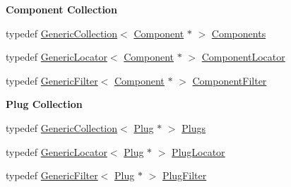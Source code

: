 \begin{Indent}\textbf{ Component Collection}\par
\begin{DoxyCompactItemize}
\item 
typedef \mbox{\hyperlink{classHurricane_1_1GenericCollection}{Generic\+Collection}}$<$ \mbox{\hyperlink{classHurricane_1_1Component}{Component}} $\ast$ $>$ \mbox{\hyperlink{namespaceHurricane_a7d26d99aeb5dd6d70d51bd35d2473e72}{Components}}
\item 
typedef \mbox{\hyperlink{classHurricane_1_1GenericLocator}{Generic\+Locator}}$<$ \mbox{\hyperlink{classHurricane_1_1Component}{Component}} $\ast$ $>$ \mbox{\hyperlink{namespaceHurricane_ad72b1998a4ff6e68326469dec9887f4d}{Component\+Locator}}
\item 
typedef \mbox{\hyperlink{classHurricane_1_1GenericFilter}{Generic\+Filter}}$<$ \mbox{\hyperlink{classHurricane_1_1Component}{Component}} $\ast$ $>$ \mbox{\hyperlink{namespaceHurricane_acbfacb3aada84aa054e587817f204e90}{Component\+Filter}}
\end{DoxyCompactItemize}
\end{Indent}
\begin{Indent}\textbf{ Plug Collection}\par
\begin{DoxyCompactItemize}
\item 
typedef \mbox{\hyperlink{classHurricane_1_1GenericCollection}{Generic\+Collection}}$<$ \mbox{\hyperlink{classHurricane_1_1Plug}{Plug}} $\ast$ $>$ \mbox{\hyperlink{namespaceHurricane_ac8335d2057483ee7a935c15a9460c64f}{Plugs}}
\item 
typedef \mbox{\hyperlink{classHurricane_1_1GenericLocator}{Generic\+Locator}}$<$ \mbox{\hyperlink{classHurricane_1_1Plug}{Plug}} $\ast$ $>$ \mbox{\hyperlink{namespaceHurricane_a99a5e89f593de242e24a24b632b0534e}{Plug\+Locator}}
\item 
typedef \mbox{\hyperlink{classHurricane_1_1GenericFilter}{Generic\+Filter}}$<$ \mbox{\hyperlink{classHurricane_1_1Plug}{Plug}} $\ast$ $>$ \mbox{\hyperlink{namespaceHurricane_ad6b0bd4bdff4c52e6163b9f54e3e5c92}{Plug\+Filter}}
\end{DoxyCompactItemize}
\end{Indent}
